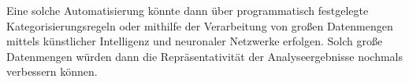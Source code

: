 Eine solche Automatisierung könnte dann über programmatisch festgelegte Kategorisierungsregeln oder mithilfe der Verarbeitung von großen Datenmengen mittels künstlicher Intelligenz und neuronaler Netzwerke erfolgen. Solch große Datenmengen würden dann die Repräsentativität der Analyseergebnisse nochmals verbessern können.